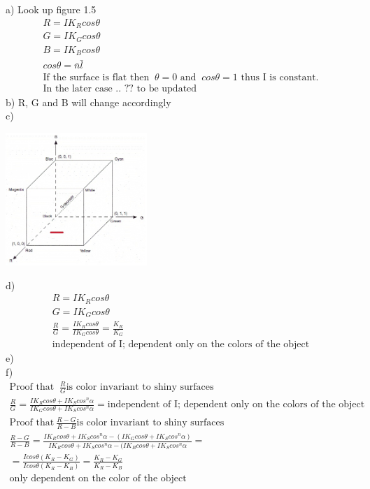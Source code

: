 \documentclass{article}
\begin{document}
\section{}
a) Look up figure 1.5
\begin{gather}  
R = I K_{R} cos\theta \\
G = I K_{G} cos\theta \\
B = I K_{B} cos\theta \\
cos\theta = \bar{n}\bar{l} \\
\text{If the surface is flat then }\ \theta = 0 \text{ and }\ cos\theta = 1 \text{ thus I is constant.}\ \\
\text{In the later case .. ?? to be updated}\
\end{gather}
b) R, G and B will change accordingly \\
c) \\
\begin{center}
\includegraphics[width=0.4\textwidth]{rgbcube.jpg}
\end{center}
d)
\begin{gather}  
R = I K_{R} cos\theta \\
G = I K_{G} cos\theta \\
\frac{R}{G} = \frac{I K_{R} cos\theta }{I K_{G} cos\theta } = \frac{K_{R}}{K_{G}} \\
\text {independent of I; dependent only on the colors of the object}\
\end{gather}
e)\\
f)\\

\begin{gather}  
\text{Proof that }\ \frac{R}{G} \text{is color invariant to shiny surfaces}\ \\
\frac{R}{G} = \frac{I K_{R} cos\theta + I K_{S} cos^{n}\alpha}{I K_{G} cos\theta + I K_{S} cos^{n}\alpha} = 
\text {independent of I; dependent only on the colors of the object}\ \\
\text{Proof that}\ \frac{R-G}{R-B} \text{is color invariant to shiny surfaces}\ \\
\frac{R-G}{R-B} =  \frac{I K_{R} cos\theta + I K_{S} cos^{n}\alpha - (I K_{G} cos\theta + I K_{S} cos^{n}\alpha)}{I K_{R} cos\theta + I K_{S} cos^{n}\alpha - (I K_{B} cos\theta + I K_{S} cos^{n}\alpha } = \\
= \frac{I cos\theta(K_{R}-K_{G})}{I cos\theta(K_{R}-K_{B})} = \frac{K_{R}-K_{G}}{K_{R}-K_{B}} \\
\text{only dependent on the color of the object}\
\end{gather}
\end{document}

